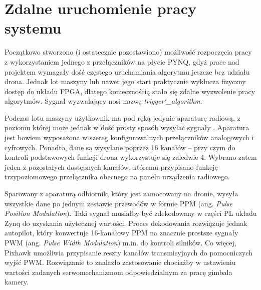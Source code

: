 \section{Zdalne uruchomienie pracy systemu}


Początkowo stworzono (i ostatecznie pozostawiono) możliwość rozpoczęcia pracy z wykorzystaniem jednego z przełączników na płycie PYNQ, gdyż prace nad projektem wymagały dość częstego uruchamiania algorytmu jeszcze bez udziału drona. 
Jednak lot maszyny lub nawet jego start praktycznie wyklucza fizyczny dostęp do układu FPGA, dlatego koniecznością stało się zdalne wyzwolenie pracy algorytmów. 
Sygnał wyzwalający nosi nazwę \textit{trigger\char`_algorithm}.

Podczas lotu maszyny użytkownik ma pod ręką jedynie aparaturę radiową, z poziomu której może jednak w dość prosty sposób wysyłać sygnały . %
Aparatura jest bowiem wyposażona w szereg konfigurowalnych przełączników analogowych i cyfrowych. 
Ponadto, dane są wysyłane poprzez 16 kanałów -- przy czym do kontroli podstawowych funkcji drona wykorzystuje się zaledwie 4. %
Wybrano zatem jeden z pozostałych dostępnych kanałów, któremu przypisano funkcję trzypoziomowego przełącznika obecnego na panelu urządzenia radiowego.

Sparowany z aparaturą odbiornik, który jest zamocowany na dronie, wysyła wszystkie dane po jednym zestawie przewodów w formie PPM (ang. \textit{Pulse Position Modulation}). %
Taki sygnał musiałby być zdekodowany w części PL układu Zynq do uzyskania użytecznej wartości. %
Proces dekodowania rozwiązuje jednak autopilot, który konwertuje 16-kanałowy PPM na znacznie prostsze sygnały PWM (ang. \textit{Pulse Width Modulation}) m.in. do kontroli silników. %
Co więcej, Pixhawk umożliwia przypisanie reszty kanałów transmisyjnych do pomocniczych wyjść PWM. 
Rozwiązanie to znalazło zastosowanie chociażby w ustawieniu wartości zadanych serwomechanizmom odpowiedzialnym za pracę gimbala kamery.

